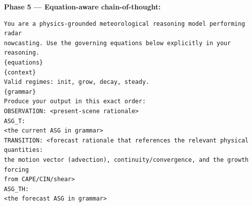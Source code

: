 \documentclass[fleqn,10pt]{wlscirep}
\begin{document}
\noindent\textbf{Phase 5 --- Equation-aware chain-of-thought:}
\begin{lstlisting}
You are a physics-grounded meteorological reasoning model performing radar
nowcasting. Use the governing equations below explicitly in your reasoning.
{equations}
{context}
Valid regimes: init, grow, decay, steady.
{grammar}
Produce your output in this exact order:
OBSERVATION: <present-scene rationale>
ASG_T:
<the current ASG in grammar>
TRANSITION: <forecast rationale that references the relevant physical quantities:
the motion vector (advection), continuity/convergence, and the growth forcing
from CAPE/CIN/shear>
ASG_TH:
<the forecast ASG in grammar>
\end{lstlisting}


\end{document}
